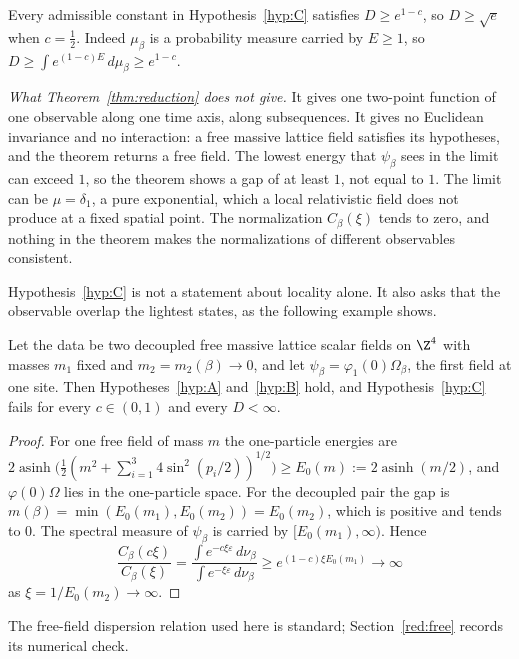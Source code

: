 Every admissible constant in Hypothesis~\ref{hyp:C} satisfies $D\ge e^{1-c}$, so $D\ge\sqrt e$ when $c=\tfrac12$. Indeed $\mu_\beta$ is a probability measure carried by $E\ge1$, so $D\ge\int e^{(1-c)E}\,d\mu_\beta\ge e^{1-c}$.

\emph{What Theorem~\ref{thm:reduction} does not give.} It gives one two-point function of one observable along one time axis, along subsequences. It gives no Euclidean invariance and no interaction: a free massive lattice field satisfies its hypotheses, and the theorem returns a free field. The lowest energy that $\psi_\beta$ sees in the limit can exceed $1$, so the theorem shows a gap of at least $1$, not equal to $1$. The limit can be $\mu=\delta_1$, a pure exponential, which a local relativistic field does not produce at a fixed spatial point. The normalization $C_\beta(\xi)$ tends to zero, and nothing in the theorem makes the normalizations of different observables consistent.

Hypothesis~\ref{hyp:C} is not a statement about locality alone. It also asks that the observable overlap the lightest states, as the following example shows.

\begin{observation}\label{red:twomass}
Let the data be two decoupled free massive lattice scalar fields on $\Z^4$ with masses $m_1$ fixed and $m_2=m_2(\beta)\to0$, and let $\psi_\beta=\varphi_1(0)\Omega_\beta$, the first field at one site. Then Hypotheses~\ref{hyp:A} and~\ref{hyp:B} hold, and Hypothesis~\ref{hyp:C} fails for every $c\in(0,1)$ and every $D<\infty$.
\end{observation}

\begin{proof}
For one free field of mass $m$ the one-particle energies are $2\operatorname{asinh}\bigl(\tfrac12(m^2+\sum_{i=1}^3 4\sin^2(p_i/2))^{1/2}\bigr)\ge E_0(m):=2\operatorname{asinh}(m/2)$, and $\varphi(0)\Omega$ lies in the one-particle space. For the decoupled pair the gap is $m(\beta)=\min(E_0(m_1),E_0(m_2))=E_0(m_2)$, which is positive and tends to $0$. The spectral measure of $\psi_\beta$ is carried by $[E_0(m_1),\infty)$. Hence
\[
  \frac{C_\beta(c\xi)}{C_\beta(\xi)}=\frac{\int e^{-c\xi\varepsilon}\,d\nu_\beta}{\int e^{-\xi\varepsilon}\,d\nu_\beta}\ge e^{(1-c)\xi E_0(m_1)}\to\infty
\]
as $\xi=1/E_0(m_2)\to\infty$.
\end{proof}

The free-field dispersion relation used here is standard; Section~\ref{red:free} records its numerical check.

